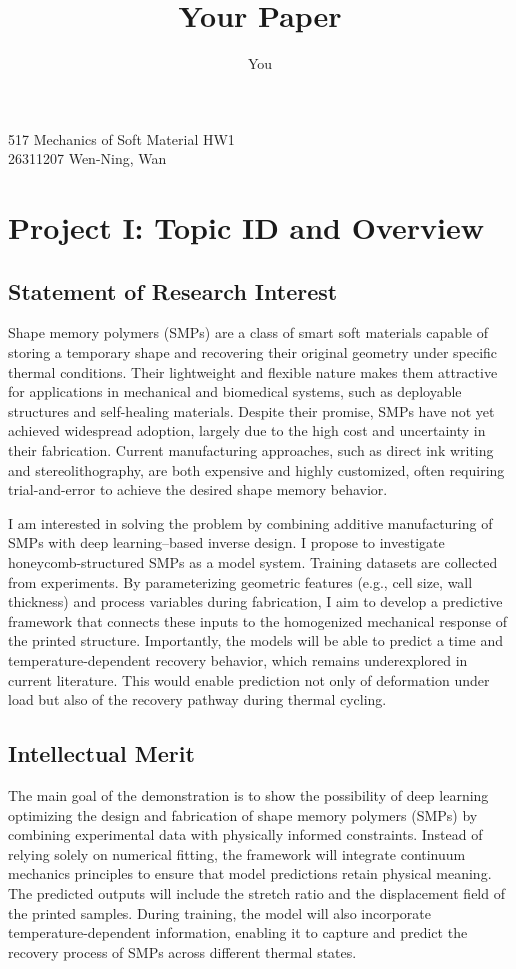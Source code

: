 \documentclass{elsarticle}
\title{Your Paper}
\author{You}
\begin{document}
\begin{center}
    517 Mechanics of Soft Material HW1\\
    26311207 Wen-Ning, Wan
\end{center}
\section{Project I: Topic ID and Overview}
\subsection{Statement of Research Interest}
Shape memory polymers (SMPs) are a class of smart soft materials capable of storing a temporary shape and recovering their original geometry under specific thermal conditions. Their lightweight and flexible nature makes them attractive for applications in mechanical and biomedical systems, such as deployable structures and self-healing materials. Despite their promise, SMPs have not yet achieved widespread adoption, largely due to the high cost and uncertainty in their fabrication. Current manufacturing approaches, such as direct ink writing and stereolithography, are both expensive and highly customized, often requiring trial-and-error to achieve the desired shape memory behavior.

I am interested in solving the problem by combining additive manufacturing of SMPs with deep learning–based inverse design. I propose to investigate honeycomb-structured SMPs as a model system. Training datasets are collected from experiments. By parameterizing geometric features (e.g., cell size, wall thickness) and process variables during fabrication, I aim to develop a predictive framework that connects these inputs to the homogenized mechanical response of the printed structure. Importantly, the models will be able to predict a time and temperature-dependent recovery behavior, which remains underexplored in current literature. This would enable prediction not only of deformation under load but also of the recovery pathway during thermal cycling.

\subsection{Intellectual Merit}
The main goal of the demonstration is to show the possibility of deep learning optimizing the design and fabrication of shape memory polymers (SMPs) by combining experimental data with physically informed constraints. Instead of relying solely on numerical fitting, the framework will integrate continuum mechanics principles to ensure that model predictions retain physical meaning. The predicted outputs will include the stretch ratio and the displacement field of the printed samples. During training, the model will also incorporate temperature-dependent information, enabling it to capture and predict the recovery process of SMPs across different thermal states.
\end{document}
